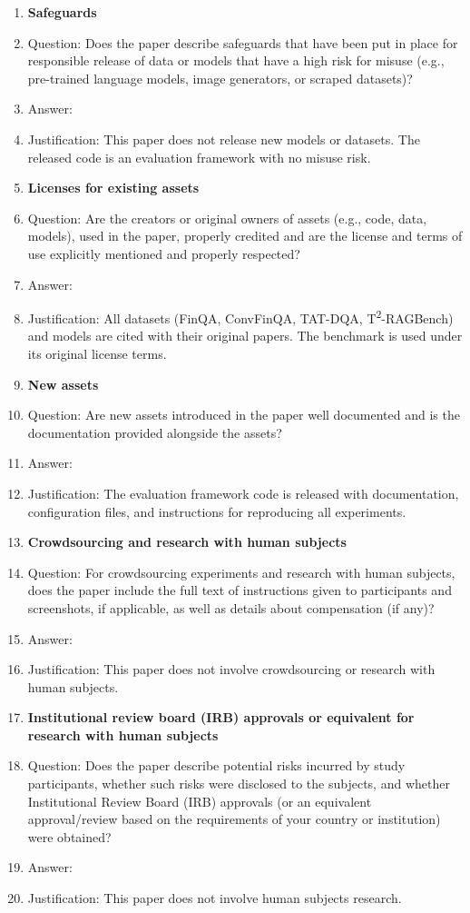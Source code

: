 \begin{enumerate}
\item {\bf Safeguards}
    \item[] Question: Does the paper describe safeguards that have been put in place for responsible release of data or models that have a high risk for misuse (e.g., pre-trained language models, image generators, or scraped datasets)?
    \item[] Answer: \answerNA{}
    \item[] Justification: This paper does not release new models or datasets. The released code is an evaluation framework with no misuse risk.

\item {\bf Licenses for existing assets}
    \item[] Question: Are the creators or original owners of assets (e.g., code, data, models), used in the paper, properly credited and are the license and terms of use explicitly mentioned and properly respected?
    \item[] Answer: \answerYes{}
    \item[] Justification: All datasets (FinQA, ConvFinQA, TAT-DQA, T\textsuperscript{2}-RAGBench) and models are cited with their original papers. The benchmark is used under its original license terms.

\item {\bf New assets}
    \item[] Question: Are new assets introduced in the paper well documented and is the documentation provided alongside the assets?
    \item[] Answer: \answerYes{}
    \item[] Justification: The evaluation framework code is released with documentation, configuration files, and instructions for reproducing all experiments.

\item {\bf Crowdsourcing and research with human subjects}
    \item[] Question: For crowdsourcing experiments and research with human subjects, does the paper include the full text of instructions given to participants and screenshots, if applicable, as well as details about compensation (if any)?
    \item[] Answer: \answerNA{}
    \item[] Justification: This paper does not involve crowdsourcing or research with human subjects.

\item {\bf Institutional review board (IRB) approvals or equivalent for research with human subjects}
    \item[] Question: Does the paper describe potential risks incurred by study participants, whether such risks were disclosed to the subjects, and whether Institutional Review Board (IRB) approvals (or an equivalent approval/review based on the requirements of your country or institution) were obtained?
    \item[] Answer: \answerNA{}
    \item[] Justification: This paper does not involve human subjects research.


\end{enumerate}
